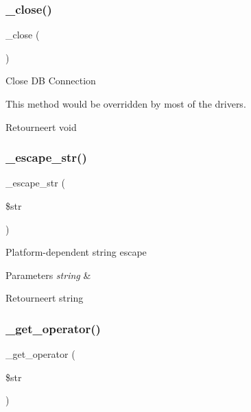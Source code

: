 \subsubsection{\texorpdfstring{\_close()}{\_close()}}
{\footnotesize\ttfamily \+\_\+close (\begin{DoxyParamCaption}{ }\end{DoxyParamCaption})\hspace{0.3cm}{\ttfamily [protected]}}

Close DB Connection

This method would be overridden by most of the drivers.

\begin{DoxyReturn}{Retourneert}
void 
\end{DoxyReturn}
\mbox{\label{class_c_i___d_b__driver_af8ef0237bfcdb19215b63fff769e7a55}} 
\subsubsection{\texorpdfstring{\_escape\_str()}{\_escape\_str()}}
{\footnotesize\ttfamily \+\_\+escape\+\_\+str (\begin{DoxyParamCaption}\item[{}]{\$str }\end{DoxyParamCaption})\hspace{0.3cm}{\ttfamily [protected]}}

Platform-\/dependent string escape


\begin{DoxyParams}{Parameters}
{\em string} & \\
\hline
\end{DoxyParams}
\begin{DoxyReturn}{Retourneert}
string 
\end{DoxyReturn}
\mbox{\label{class_c_i___d_b__driver_af932ab30583179e70fa44f91dc9c5b4d}} 
\subsubsection{\texorpdfstring{\_get\_operator()}{\_get\_operator()}}
{\footnotesize\ttfamily \+\_\+get\+\_\+operator (\begin{DoxyParamCaption}\item[{}]{\$str }\end{DoxyParamCaption})\hspace{0.3cm}{\ttfamily [protected]}}

